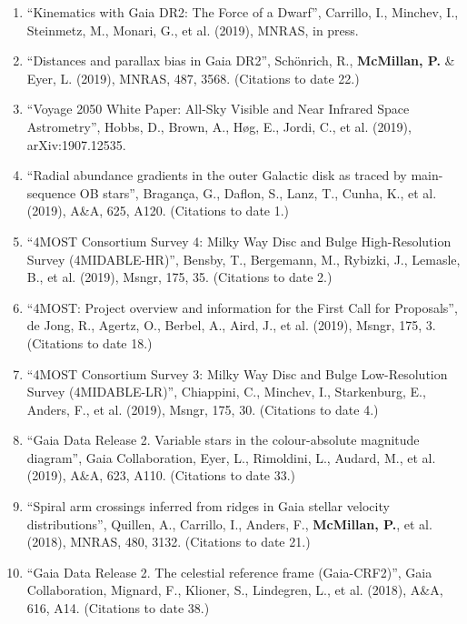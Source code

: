 \documentclass{resume}
\begin{document}
\begin{enumerate}
\item ``Kinematics with Gaia DR2: The Force of a Dwarf'', Carrillo, I., Minchev, I., Steinmetz, M., Monari, G., et al. (2019), MNRAS, in press.

\item ``Distances and parallax bias in Gaia DR2'', Sch\"onrich, R., \textbf{McMillan, P.} \& Eyer, L. (2019), MNRAS, 487, 3568. (Citations to date 22.)

\item ``Voyage 2050 White Paper: All-Sky Visible and Near Infrared Space Astrometry'', Hobbs, D., Brown, A., H{\o}g, E., Jordi, C., et al. (2019), arXiv:1907.12535.

\item ``Radial abundance gradients in the outer Galactic disk as traced by main-sequence OB stars'', Bragan\c{c}a, G., Daflon, S., Lanz, T., Cunha, K., et al. (2019), A\&A, 625, A120. (Citations to date 1.)

\item ``4MOST Consortium Survey 4: Milky Way Disc and Bulge High-Resolution Survey (4MIDABLE-HR)'', Bensby, T., Bergemann, M., Rybizki, J., Lemasle, B., et al. (2019), Msngr, 175, 35. (Citations to date 2.)

\item ``4MOST: Project overview and information for the First Call for Proposals'', de Jong, R., Agertz, O., Berbel, A., Aird, J., et al. (2019), Msngr, 175, 3. (Citations to date 18.)

\item ``4MOST Consortium Survey 3: Milky Way Disc and Bulge Low-Resolution Survey (4MIDABLE-LR)'', Chiappini, C., Minchev, I., Starkenburg, E., Anders, F., et al. (2019), Msngr, 175, 30. (Citations to date 4.)

\item ``Gaia Data Release 2. Variable stars in the colour-absolute magnitude diagram'', Gaia Collaboration, Eyer, L., Rimoldini, L., Audard, M., et al. (2019), A\&A, 623, A110. (Citations to date 33.)

\item ``Spiral arm crossings inferred from ridges in Gaia stellar velocity distributions'', Quillen, A., Carrillo, I., Anders, F., \textbf{McMillan, P.}, et al. (2018), MNRAS, 480, 3132. (Citations to date 21.)

\item ``Gaia Data Release 2. The celestial reference frame (Gaia-CRF2)'', Gaia Collaboration, Mignard, F., Klioner, S., Lindegren, L., et al. (2018), A\&A, 616, A14. (Citations to date 38.)


\end{enumerate}
\end{document}
